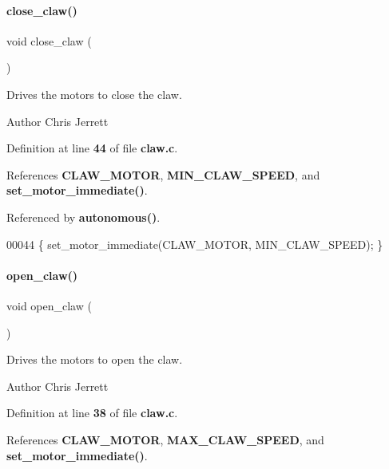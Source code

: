 \paragraph{close\+\_\+claw()}
{\footnotesize\ttfamily void close\+\_\+claw (\begin{DoxyParamCaption}{ }\end{DoxyParamCaption})}



Drives the motors to close the claw. 

\begin{DoxyAuthor}{Author}
Chris Jerrett 
\end{DoxyAuthor}


Definition at line \textbf{ 44} of file \textbf{ claw.\+c}.



References \textbf{ C\+L\+A\+W\+\_\+\+M\+O\+T\+OR}, \textbf{ M\+I\+N\+\_\+\+C\+L\+A\+W\+\_\+\+S\+P\+E\+ED}, and \textbf{ set\+\_\+motor\+\_\+immediate()}.



Referenced by \textbf{ autonomous()}.


\begin{DoxyCode}
00044 \{ set_motor_immediate(CLAW_MOTOR, MIN_CLAW_SPEED); \}
\end{DoxyCode}
\mbox{\label{a00086_a03023ca28f671b9fa7bac07782ccd8c1}} 
\paragraph{open\+\_\+claw()}
{\footnotesize\ttfamily void open\+\_\+claw (\begin{DoxyParamCaption}{ }\end{DoxyParamCaption})}



Drives the motors to open the claw. 

\begin{DoxyAuthor}{Author}
Chris Jerrett 
\end{DoxyAuthor}


Definition at line \textbf{ 38} of file \textbf{ claw.\+c}.



References \textbf{ C\+L\+A\+W\+\_\+\+M\+O\+T\+OR}, \textbf{ M\+A\+X\+\_\+\+C\+L\+A\+W\+\_\+\+S\+P\+E\+ED}, and \textbf{ set\+\_\+motor\+\_\+immediate()}.



